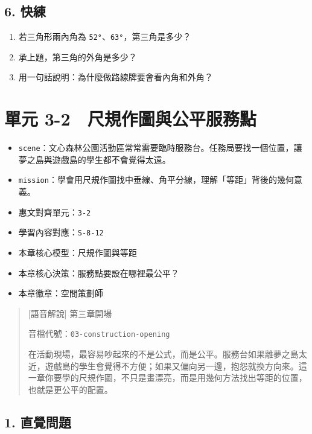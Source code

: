 \documentclass[
  chinese,
  12pt,
  a4paper,
  oneside]{article}
\providecommand{\tightlist}{%
  \setlength{\itemsep}{0pt}\setlength{\parskip}{0pt}}
\begin{document}
\subsection{6. 快練}\label{ux5febux7df4-1}

\begin{enumerate}
\def\labelenumi{\arabic{enumi}.}
\tightlist
\item
  若三角形兩內角為 \texttt{52°}、\texttt{63°}，第三角是多少？
\item
  承上題，第三角的外角是多少？
\item
  用一句話說明：為什麼做路線牌要會看內角和外角？
\end{enumerate}

\newpage

\section{單元
3-2　尺規作圖與公平服務點}\label{ux55aeux5143-3-2-ux5c3aux898fux4f5cux5716ux8207ux516cux5e73ux670dux52d9ux9ede}

\begin{itemize}
\tightlist
\item
  \texttt{scene}：文心森林公園活動區常常需要臨時服務台。任務局要找一個位置，讓夢之島與遊戲島的學生都不會覺得太遠。
\item
  \texttt{mission}：學會用尺規作圖找中垂線、角平分線，理解「等距」背後的幾何意義。
\item
  惠文對齊單元：\texttt{3-2}
\item
  學習內容對應：\texttt{S-8-12}
\item
  本章核心模型：尺規作圖與等距
\item
  本章核心決策：服務點要設在哪裡最公平？
\item
  本章徽章：空間策劃師
\end{itemize}

\begin{quote}
{[}語音解說{]} 第三章開場

音檔代號：\texttt{03-construction-opening}

在活動現場，最容易吵起來的不是公式，而是公平。服務台如果離夢之島太近，遊戲島的學生會覺得不方便；如果又偏向另一邊，抱怨就換方向來。這一章你要學的尺規作圖，不只是畫漂亮，而是用幾何方法找出等距的位置，也就是更公平的配置。
\end{quote}

\subsection{1. 直覺問題}\label{ux76f4ux89baux554fux984c-4}
\end{document}
